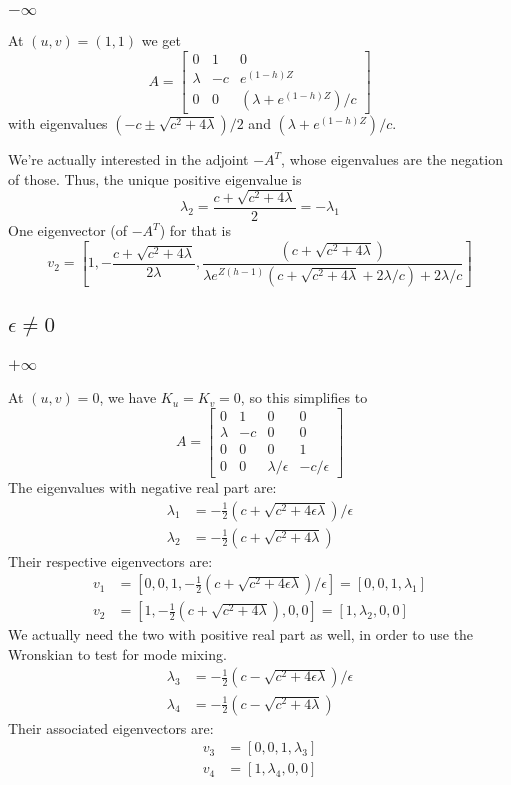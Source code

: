 \documentclass[10pt]{article}
\begin{document}
\subsubsection{$-\infty$}
At $(u,v) = (1,1)$ we get
\[
A = \begin{bmatrix}
0 & 1 & 0 \\
\lambda &  -c  &  e^{(1-h)Z} \\
0 &  0  &  (\lambda + e^{(1-h)Z})/c
\end{bmatrix}
\]
with eigenvalues $(-c \pm \sqrt{c^2 + 4 \lambda})/2$ and $(\lambda + e^{(1-h)Z})/c$.

We're actually interested in the adjoint $-A^T$, whose eigenvalues are the negation of those.
Thus, the unique positive eigenvalue is
\[\lambda_2 = \frac{c + \sqrt{c^2 + 4 \lambda}}{2} = -\lambda_1 \]
One eigenvector (of $-A^T$) for that is
\[
v_2 = \left[1, -\frac{c + \sqrt{c^2 + 4 \lambda}}{2\lambda}, \frac{(c + \sqrt{c^2+4\lambda})}{\lambda e^{Z(h-1)}(c + \sqrt{c^2+4\lambda} + 2 \lambda/c)+ 2 \lambda / c}\right]
\]

\subsection{$\epsilon \neq 0$}
\subsubsection{$+\infty$}
At $(u,v) = 0$, we have $K_u = K_v = 0$, so this simplifies to
\[
A = \begin{bmatrix}
0 & 1 & 0 & 0 \\
\lambda &  -c  &  0  & 0 \\
0 & 0 & 0 & 1 \\
0 &  0  &  \lambda /\epsilon  &  - c / \epsilon
\end{bmatrix}
\]
The eigenvalues with negative real part are:
\begin{align*}
    \lambda_1 &= -\frac{1}{2} (c + \sqrt{c^2 + 4 \epsilon \lambda})/\epsilon\\
    \lambda_2 &= -\frac{1}{2} (c + \sqrt{c^2 + 4 \lambda})
\end{align*}
Their respective eigenvectors are:
\begin{align*}
    v_1 &= [0,0,1,-\frac{1}{2} (c + \sqrt{c^2 + 4 \epsilon \lambda})/\epsilon] = [0,0,1,\lambda_1] \\
    v_2 &= [1, -\frac{1}{2} (c + \sqrt{c^2 + 4 \lambda}), 0, 0] = [1,\lambda_2,0,0]
\end{align*}
We actually need the two with positive real part as well, in order to use the Wronskian to test for mode mixing.
\begin{align*}
    \lambda_3 &= -\frac{1}{2} (c - \sqrt{c^2 + 4 \epsilon \lambda})/\epsilon\\
    \lambda_4 &= -\frac{1}{2} (c - \sqrt{c^2 + 4 \lambda})
\end{align*}
Their associated eigenvectors are:
\begin{align*}
    v_3 &= [0,0,1,\lambda_3] \\
    v_4 &= [1,\lambda_4,0,0]
\end{align*}
\end{document}
